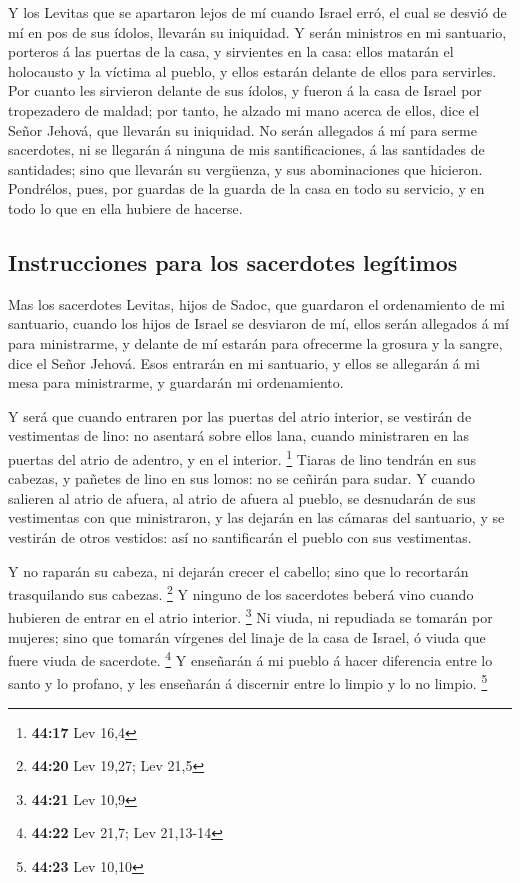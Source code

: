  Y los Levitas que se apartaron lejos de mí cuando Israel
erró, el cual se desvió de mí en pos de sus ídolos, llevarán su
iniquidad.  Y serán ministros en mi santuario, porteros á
las puertas de la casa, y sirvientes en la casa: ellos matarán el
holocausto y la víctima al pueblo, y ellos estarán delante de ellos para
servirles.  Por cuanto les sirvieron delante de sus ídolos,
y fueron á la casa de Israel por tropezadero de maldad; por tanto, he
alzado mi mano acerca de ellos, dice el Señor Jehová, que llevarán su
iniquidad.  No serán allegados á mí para serme sacerdotes,
ni se llegarán á ninguna de mis santificaciones, á las santidades de
santidades; sino que llevarán su vergüenza, y sus abominaciones que
hicieron.  Pondrélos, pues, por guardas de la guarda de la
casa en todo su servicio, y en todo lo que en ella hubiere de hacerse.

\hypertarget{instrucciones-para-los-sacerdotes-leguxedtimos}{%
\subsection{Instrucciones para los sacerdotes
legítimos}\label{instrucciones-para-los-sacerdotes-leguxedtimos}}

 Mas los sacerdotes Levitas, hijos de Sadoc, que guardaron
el ordenamiento de mi santuario, cuando los hijos de Israel se desviaron
de mí, ellos serán allegados á mí para ministrarme, y delante de mí
estarán para ofrecerme la grosura y la sangre, dice el Señor Jehová.
 Esos entrarán en mi santuario, y ellos se allegarán á mi
mesa para ministrarme, y guardarán mi ordenamiento.

 Y será que cuando entraren por las puertas del atrio
interior, se vestirán de vestimentas de lino: no asentará sobre ellos
lana, cuando ministraren en las puertas del atrio de adentro, y en el
interior. \footnote{\textbf{44:17} Lev 16,4}  Tiaras de
lino tendrán en sus cabezas, y pañetes de lino en sus lomos: no se
ceñirán para sudar.  Y cuando salieren al atrio de afuera,
al atrio de afuera al pueblo, se desnudarán de sus vestimentas con que
ministraron, y las dejarán en las cámaras del santuario, y se vestirán
de otros vestidos: así no santificarán el pueblo con sus vestimentas.

 Y no raparán su cabeza, ni dejarán crecer el cabello; sino
que lo recortarán trasquilando sus cabezas. \footnote{\textbf{44:20} Lev
  19,27; Lev 21,5}  Y ninguno de los sacerdotes beberá vino
cuando hubieren de entrar en el atrio interior. \footnote{\textbf{44:21}
  Lev 10,9}  Ni viuda, ni repudiada se tomarán por mujeres;
sino que tomarán vírgenes del linaje de la casa de Israel, ó viuda que
fuere viuda de sacerdote. \footnote{\textbf{44:22} Lev 21,7; Lev
  21,13-14}  Y enseñarán á mi pueblo á hacer diferencia
entre lo santo y lo profano, y les enseñarán á discernir entre lo limpio
y lo no limpio. \footnote{\textbf{44:23} Lev 10,10}

